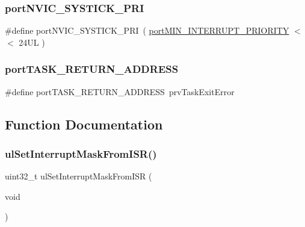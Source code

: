 \mbox{\label{thirdparty_2freertos_2freertos-10_80_80_2_source_2portable_2_g_c_c_2_a_r_m___c_m0_2port_8c_ae4ddaa528bc05260d1a5a607c8a00d9f}} 
\subsubsection{\texorpdfstring{portNVIC\_SYSTICK\_PRI}{portNVIC\_SYSTICK\_PRI}}
{\footnotesize\ttfamily \#define port\+N\+V\+I\+C\+\_\+\+S\+Y\+S\+T\+I\+C\+K\+\_\+\+P\+RI~( \mbox{\hyperlink{thirdparty_2freertos_2freertos-10_80_80_2_source_2portable_2_g_c_c_2_a_r_m___c_m0_2port_8c_a7695fa51586f81228c89bcf517ec44f3}{port\+M\+I\+N\+\_\+\+I\+N\+T\+E\+R\+R\+U\+P\+T\+\_\+\+P\+R\+I\+O\+R\+I\+TY}} $<$$<$ 24\+U\+L )}

\mbox{\label{thirdparty_2freertos_2freertos-10_80_80_2_source_2portable_2_g_c_c_2_a_r_m___c_m0_2port_8c_a254a1ddd7499c6ec36b38e2fc3486b80}} 
\subsubsection{\texorpdfstring{portTASK\_RETURN\_ADDRESS}{portTASK\_RETURN\_ADDRESS}}
{\footnotesize\ttfamily \#define port\+T\+A\+S\+K\+\_\+\+R\+E\+T\+U\+R\+N\+\_\+\+A\+D\+D\+R\+E\+SS~prv\+Task\+Exit\+Error}



\subsection{Function Documentation}
\mbox{\label{thirdparty_2freertos_2freertos-10_80_80_2_source_2portable_2_g_c_c_2_a_r_m___c_m0_2port_8c_a9f629ba0917b46bc9586dfc49df557ed}} 
\subsubsection{\texorpdfstring{ulSetInterruptMaskFromISR()}{ulSetInterruptMaskFromISR()}}
{\footnotesize\ttfamily uint32\+\_\+t ul\+Set\+Interrupt\+Mask\+From\+I\+SR (\begin{DoxyParamCaption}\item[{void}]{ }\end{DoxyParamCaption})}

